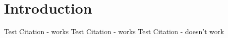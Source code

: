 \documentclass[12pt]{article}
\begin{document}
\newpage
\tableofcontents

\newpage

\section{Introduction}

Test Citation - works \cite[1]{steindlKIVerordnungRevisited2023} 
Test Citation - works \cite[73]{maslejAIIndex20232023}
Test Citation - doesn't work \cite[1]{gorzalaEuropaischesHaftungssystemFur2023} 

\printbibliography
\end{document}
